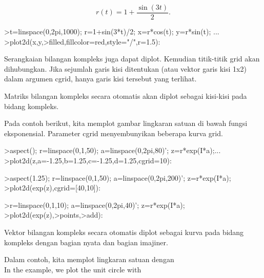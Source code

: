 \documentclass{article}
\begin{document}
\begin{eulernotebook}
\begin{eulercomment}
\begin{eulercomment}
\begin{eulercomment}
\begin{eulercomment}
\begin{eulercomment}
\begin{eulercomment}
\begin{eulercomment}
\begin{eulercomment}
\begin{eulercomment}
\begin{eulercomment}
\begin{eulercomment}
\begin{eulercomment}
\begin{eulercomment}
\begin{eulercomment}
\begin{eulercomment}
\end{eulercomment}
\begin{eulerformula}
\[
r(t) = 1 + \dfrac{\sin(3t)}{2}.
\]
\end{eulerformula}
\begin{eulerprompt}
>t=linspace(0,2pi,1000); r=1+sin(3*t)/2; x=r*cos(t); y=r*sin(t); ...
>plot2d(x,y,>filled,fillcolor=red,style="/",r=1.5):
\end{eulerprompt}
\begin{eulercomment}
Serangkaian bilangan kompleks juga dapat diplot. Kemudian titik-titik
grid akan dihubungkan. Jika sejumlah garis kisi ditentukan (atau
vektor garis kisi 1x2) dalam argumen cgrid, hanya garis kisi tersebut
yang terlihat.

Matriks bilangan kompleks secara otomatis akan diplot sebagai
kisi-kisi pada bidang kompleks.

Pada contoh berikut, kita memplot gambar lingkaran satuan di bawah
fungsi eksponensial. Parameter cgrid menyembunyikan beberapa kurva
grid.
\end{eulercomment}
\begin{eulerprompt}
>aspect(); r=linspace(0,1,50); a=linspace(0,2pi,80)'; z=r*exp(I*a);...
>plot2d(z,a=-1.25,b=1.25,c=-1.25,d=1.25,cgrid=10):
\end{eulerprompt}
\begin{eulerprompt}
>aspect(1.25); r=linspace(0,1,50); a=linspace(0,2pi,200)'; z=r*exp(I*a);
>plot2d(exp(z),cgrid=[40,10]):
\end{eulerprompt}
\begin{eulerprompt}
>r=linspace(0,1,10); a=linspace(0,2pi,40)'; z=r*exp(I*a);
>plot2d(exp(z),>points,>add):
\end{eulerprompt}
\begin{eulercomment}
Vektor bilangan kompleks secara otomatis diplot sebagai kurva pada
bidang kompleks dengan bagian nyata dan bagian imajiner.

Dalam contoh, kita memplot lingkaran satuan dengan\\
In the example, we plot the unit circle with


\end{eulercomment}
\end{eulercomment}
\end{eulercomment}
\end{eulercomment}
\end{eulercomment}
\end{eulercomment}
\end{eulercomment}
\end{eulercomment}
\end{eulercomment}
\end{eulercomment}
\end{eulercomment}
\end{eulercomment}
\end{eulercomment}
\end{eulercomment}
\end{eulercomment}
\end{eulernotebook}
\end{document}
